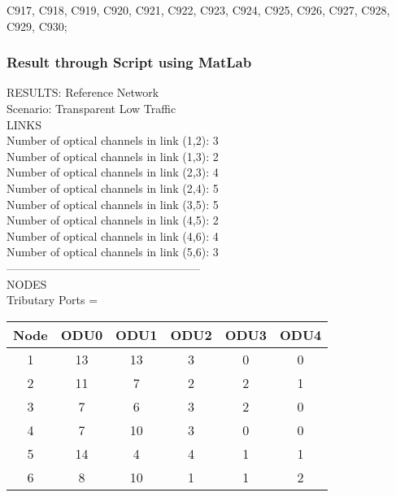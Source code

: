 C917, C918, C919, C920, C921, C922, C923, C924, C925, C926, C927, C928, C929, C930; \\


\subsubsection{Result through Script using MatLab}

\qquad RESULTS: Reference Network \\

\quad Scenario: Transparent Low Traffic \\

LINKS \\

Number of optical channels in link (1,2): 3\\
\qquad Number of optical channels in link (1,3): 2\\
\qquad Number of optical channels in link (2,3): 4\\
\qquad Number of optical channels in link (2,4): 5\\
\qquad Number of optical channels in link (3,5): 5\\
\qquad Number of optical channels in link (4,5): 2\\
\qquad Number of optical channels in link (4,6): 4\\
\qquad Number of optical channels in link (5,6): 3\\

--------------------------------------------------- \\
NODES \\


Tributary  Ports = \\


\begin{tabular}{|c|c|c|c|c|c|}
  \hline
  Node & ODU0 & ODU1 & ODU2 & ODU3 & ODU4 \\
  \hline\hline
  1 & 13 & 13 & 3 & 0 & 0 \\
  2 & 11 & 7 & 2 & 2 & 1 \\
  3 & 7 & 6 & 3 & 2 & 0 \\
  4 & 7 & 10 & 3 & 0 & 0 \\
  5 & 14 & 4 & 4 & 1 & 1 \\
  6 & 8 & 10 & 1 & 1 & 2 \\
  \hline
\end{tabular}

\vspace{15pt}

